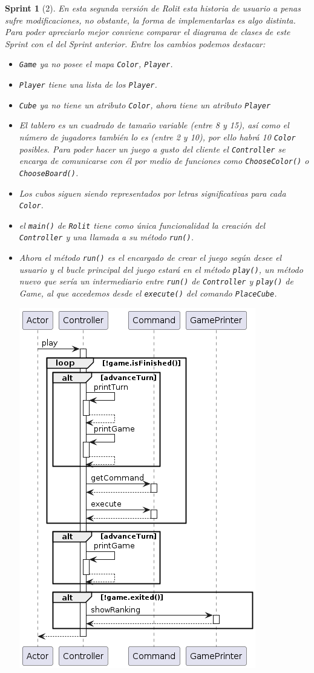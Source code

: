 \documentclass[12pt,a4paper,openright]{book}
\theoremstyle{break}
\newtheorem*{sprint}{Sprint}
\begin{document}
\begin{sprint}[2]
En esta segunda versión de Rolit esta historia de usuario a penas sufre modificaciones, no obstante, la forma de implementarlas es algo distinta. Para poder apreciarlo mejor conviene comparar el diagrama de clases de este Sprint con el del Sprint anterior. Entre los cambios podemos destacar:
\begin{itemize}
\item \texttt{Game} ya no posee el mapa \texttt{Color}, \texttt{Player}.
\item \texttt{Player} tiene una lista de los \texttt{Player}.
\item \texttt{Cube} ya no tiene un atributo \texttt{Color}, ahora tiene un atributo \texttt{Player}
\item El tablero es un cuadrado de tamaño variable (entre 8 y 15), así como el número de jugadores también lo es (entre 2 y 10), por ello habrá 10 \texttt{Color} posibles. Para poder hacer un juego a gusto del cliente el \texttt{Controller} se encarga de comunicarse con él por medio de funciones como \texttt{ChooseColor()} o \texttt{ChooseBoard()}. 
\item Los cubos siguen siendo representados por letras significativas para cada \texttt{Color}.
\item el \texttt{main()} de \texttt{Rolit} tiene como única funcionalidad la creación del \texttt{Controller} y una llamada a su método \texttt{run()}.
\item Ahora el método \texttt{run()} es el encargado de crear el juego según desee el usuario y el bucle principal del juego estará en el método \texttt{play()}, un método nuevo que sería un intermediario entre \texttt{run()} de \texttt{Controller} y \texttt{play()} de Game, al que accedemos desde el \texttt{execute()} del comando \texttt{PlaceCube}.
\begin{center}
\includegraphics[scale=0.5]{playS2.png}

\end{center}
\end{itemize}
\end{sprint}
\end{document}
